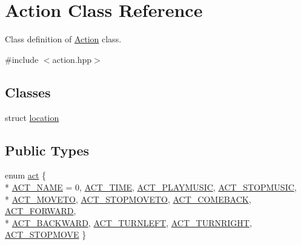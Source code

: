 \hypertarget{classAction}{\section{Action Class Reference}
\label{classAction}
}


Class definition of \hyperlink{classAction}{Action} class.  




{\ttfamily \#include $<$action.\-hpp$>$}

\subsection*{Classes}
\begin{DoxyCompactItemize}
\item 
struct \hyperlink{structAction_1_1location}{location}
\end{DoxyCompactItemize}
\subsection*{Public Types}
\begin{DoxyCompactItemize}
\item 
enum \hyperlink{classAction_ab5ece0fcaae0e78adfa0f7b36893401e}{act} \{ \\*
\hyperlink{classAction_ab5ece0fcaae0e78adfa0f7b36893401ea74ee75d4ee7d6c38821b7778e4cf312d}{A\-C\-T\-\_\-\-N\-A\-M\-E} = 0, 
\hyperlink{classAction_ab5ece0fcaae0e78adfa0f7b36893401ea0d985b60ff2ede3b499e31bf513b3d4d}{A\-C\-T\-\_\-\-T\-I\-M\-E}, 
\hyperlink{classAction_ab5ece0fcaae0e78adfa0f7b36893401ea8076549c67d15d4e7592e7e049e95704}{A\-C\-T\-\_\-\-P\-L\-A\-Y\-M\-U\-S\-I\-C}, 
\hyperlink{classAction_ab5ece0fcaae0e78adfa0f7b36893401eab0aa05686496e740cfafc8679700a020}{A\-C\-T\-\_\-\-S\-T\-O\-P\-M\-U\-S\-I\-C}, 
\\*
\hyperlink{classAction_ab5ece0fcaae0e78adfa0f7b36893401eab60c58ddc0cb20cb35c655950658c0aa}{A\-C\-T\-\_\-\-M\-O\-V\-E\-T\-O}, 
\hyperlink{classAction_ab5ece0fcaae0e78adfa0f7b36893401ea3a23268cc940107edb9c83aa81a70db5}{A\-C\-T\-\_\-\-S\-T\-O\-P\-M\-O\-V\-E\-T\-O}, 
\hyperlink{classAction_ab5ece0fcaae0e78adfa0f7b36893401eac7ee7a0120639ce1e2c7c974d25c1fe2}{A\-C\-T\-\_\-\-C\-O\-M\-E\-B\-A\-C\-K}, 
\hyperlink{classAction_ab5ece0fcaae0e78adfa0f7b36893401eaffa6a5a97917fca484424d7f6cc62972}{A\-C\-T\-\_\-\-F\-O\-R\-W\-A\-R\-D}, 
\\*
\hyperlink{classAction_ab5ece0fcaae0e78adfa0f7b36893401ea2c3c1230c27e63c38d5da9693d9a3337}{A\-C\-T\-\_\-\-B\-A\-C\-K\-W\-A\-R\-D}, 
\hyperlink{classAction_ab5ece0fcaae0e78adfa0f7b36893401ea0a65bc73f315d27eda53fcf9064c9194}{A\-C\-T\-\_\-\-T\-U\-R\-N\-L\-E\-F\-T}, 
\hyperlink{classAction_ab5ece0fcaae0e78adfa0f7b36893401ea0268f72608a5003500aa26f84a70459c}{A\-C\-T\-\_\-\-T\-U\-R\-N\-R\-I\-G\-H\-T}, 
\hyperlink{classAction_ab5ece0fcaae0e78adfa0f7b36893401ea6062ac2373825affaacc622fe79dc904}{A\-C\-T\-\_\-\-S\-T\-O\-P\-M\-O\-V\-E}
 \}
\end{DoxyCompactItemize}
